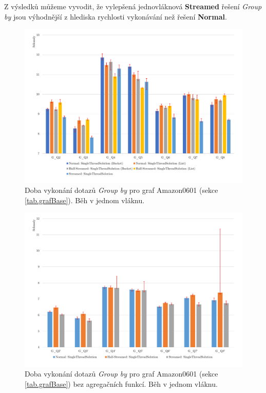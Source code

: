 \bigskip
Z výsledků můžeme vyvodit, že vylepšená jednovláknová \textbf{Streamed} řešení \textit{Group by} jsou výhodnější z hlediska rychlosti vykonávání než řešení \textbf{Normal}. 

\begin{figure}[!htp]
\includegraphics[width=\linewidth]{../img/amazonGroupByST.pdf}\centering
\caption{Doba vykonání dotazů \textit{Group by} pro graf Amazon0601 (sekce \ref{tab.grafBase}). Běh v jednom vláknu.}
\label{figure.amazonGroupByST}
\end{figure}
\begin{figure}[!htp]
\includegraphics[width=\linewidth]{../img/amazonGroupBySTNoAgg.pdf}\centering
\caption{Doba vykonání dotazů \textit{Group by} pro graf Amazon0601 (sekce \ref{tab.grafBase})  bez agregačních funkcí. Běh v jednom vláknu.}
\label{figure.amazonGroupBySTNoAgg}
\end{figure}


